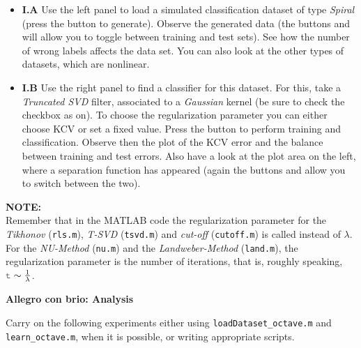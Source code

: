 \documentclass[DIN, pagenumber=false, fontsize=11pt, parskip=half]{scrartcl}
\newcommand{\mysection}[1]{\noindent\large\textbf{#1}}
\begin{document}
\begin{itemize}
	\item \textbf{I.A} Use the left panel to load  a simulated classification dataset of type \textit{Spiral} (press the button  to generate).
	Observe the generated data (the buttons  and  will allow you to toggle between training and test sets).
	See how the number of wrong labels affects the data set.
	You can also look at the other types of datasets, which are nonlinear.
	\item \textbf{I.B} 
	Use the right panel to find a  classifier for this dataset.
	For this, take a \textit{Truncated SVD} filter, associated to a \textit{Gaussian} kernel (be sure to check the  checkbox as on).
	To choose the regularization parameter you can either choose KCV or set a fixed value.
	Press the button  to perform training and classification.
	Observe then the plot of the KCV error and the balance between training and test errors.
	Also have a look at the plot area on the left, where a separation function has appeared (again the buttons  and  allow you to switch between the two).
\end{itemize}

\begin{framed}
\textbf{NOTE:} \\
Remember that in the MATLAB code the regularization parameter for the \emph{Tikhonov} (\texttt{rls.m}), \emph{T-SVD} (\texttt{tsvd.m}) and \emph{cut-off} (\texttt{cutoff.m}) is called  instead of $\lambda$. For the \emph{NU-Method} (\texttt{nu.m}) and the \emph{Landweber-Method} (\texttt{land.m}), the regularization parameter  is the number of iterations, that is, roughly speaking, $\mcode{t} \sim \frac{1}{\lambda}$.
\end{framed}




\mysection{Allegro con brio: Analysis}

Carry on the following experiments either using \texttt{loadDataset\_octave.m} and \texttt{learn\_octave.m}, when it is possible, or writing appropriate scripts.
\end{document}
